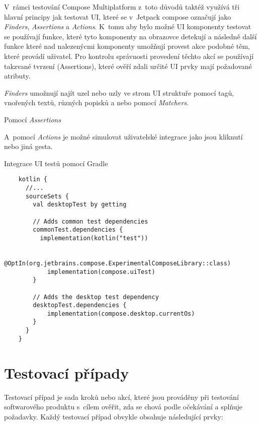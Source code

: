 V~rámci testování
Compose Multiplatform z~toto důvodů taktéž využívá tři hlavní principy jak testovat UI, které se v~Jetpack compose
označují jako \textit{Finders}, \textit{Assertions} a \textit{Actions}. 
K~tomu aby bylo možné UI komponenty testovat se používají funkce, které tyto komponenty na obrazovce detekují a následně další funkce které nad nalezenýcmi 
komponenty umožňují provest akce podobné těm, které provádí uživatel. Pro kontrolu správnosti provedení těchto akcí se používají takzvané tvrzení 
(Assertions), které ověří zdali určité UI prvky mají požadované atributy.

\textit{Finders} umožnují najít uzel nebo uzly ve strom UI struktuře pomocí tagů, vnořených textů, různých popisků a nebo pomocí \textit{Matchers}.


Pomocí \textit{Assertions}

A~pomocí \textit{Actions} je možné simulovat uživatelské integrace jako jsou kliknutí nebo jiná gesta. \cite{composeTesting}



\begin{listing}[H]
  \caption{Integrace UI testů pomocí Gradle}\label{lst:testsIntegration}
  \begin{verbatim}
    kotlin {
      //...
      sourceSets {
        val desktopTest by getting
    
        // Adds common test dependencies
        commonTest.dependencies {
          implementation(kotlin("test"))
    
            @OptIn(org.jetbrains.compose.ExperimentalComposeLibrary::class)
            implementation(compose.uiTest)
        }
    
        // Adds the desktop test dependency
        desktopTest.dependencies {
            implementation(compose.desktop.currentOs)
        }
      }
    }
\end{verbatim}
\end{listing}

\section{Testovací případy}
Testovací případ je sada kroků nebo akcí, které jsou prováděny při testování softwarového produktu s~cílem ověřit, zda se chová podle očekávání a splňuje 
požadavky. Každý testovací případ obvykle obsahuje následující prvky:

